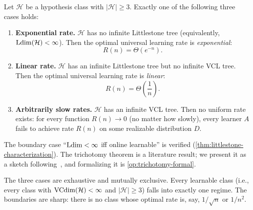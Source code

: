 \begin{thm}
\label{thm:trichotomy}
Let $\mathcal{H}$ be a hypothesis class with $|\mathcal{H}| \geq 3$.
Exactly one of the following three cases holds:
\begin{enumerate}[label=\textnormal{(T\arabic*)}]
\item \label{T:exp} \textbf{Exponential rate.}  $\mathcal{H}$ has no
  infinite Littlestone tree (equivalently, $\mathrm{Ldim}(\mathcal{H}) < \infty$).
  Then the optimal universal learning rate is \emph{exponential}:
  \[
    R(n) = \Theta\!\left(e^{-n}\right).
  \]

\item \label{T:linear} \textbf{Linear rate.}  $\mathcal{H}$ has an infinite
  Littlestone tree but no infinite VCL tree.  Then the optimal universal
  learning rate is \emph{linear}:
  \[
    R(n) = \Theta\!\left(\frac{1}{n}\right).
  \]

\item \label{T:arb} \textbf{Arbitrarily slow rates.}  $\mathcal{H}$ has an
  infinite VCL tree.  Then no uniform rate exists: for every function
  $R(n) \to 0$ (no matter how slowly), every learner $A$ fails to achieve
  rate $R(n)$ on some realizable distribution $D$.
\end{enumerate}
\end{thm}

\begin{remark}
\label{rmk:trichotomy-formal}
The boundary case ``$\mathrm{Ldim} < \infty$ iff online learnable'' is verified (\cref{thm:littlestone-characterization}).  The trichotomy theorem is a literature result; we present it as a sketch following~\cite{BousquetHannekeMoranVanHandelYehudayoff2021}, and formalizing it is \cref{op:trichotomy-formal}.
\end{remark}

The three cases are exhaustive and mutually exclusive.  Every learnable class
(i.e., every class with $\mathrm{VCdim}(\mathcal{H}) < \infty$ and
$|\mathcal{H}| \geq 3$) falls into exactly one regime.  The boundaries are
sharp: there is no class whose optimal rate is, say, $1/\sqrt{n}$ or
$1/n^2$.

